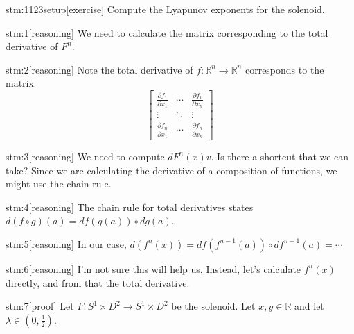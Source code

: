 
\begin{stm}{stm:1123setup}[exercise]
Compute the Lyapunov exponents for the solenoid.
\end{stm}


\begin{stm}{stm:1}[reasoning]
We need to calculate the matrix corresponding to the total derivative of $F^n$.
\end{stm}

\begin{stm}{stm:2}[reasoning]
Note the total derivative of $f \colon \mathbb{R}^n \to \mathbb{R}^n$ corresponds to the matrix
\[
\left[
\begin{array}{ccc}
\frac{\partial f_1}{\partial x_1} & \cdots & \frac{\partial f_1}{\partial x_n} \\
\vdots & \ddots & \vdots \\
\frac{\partial f_n}{\partial x_1} & \cdots & \frac{\partial f_n}{\partial x_n}
\end{array}
\right]
\]
\end{stm}

\begin{stm}{stm:3}[reasoning]
We need to compute $dF^n(x)v$. Is there a shortcut that we can take? Since we are calculating the derivative of a composition of functions, we might use the chain rule.
\end{stm}

\begin{stm}{stm:4}[reasoning]
The chain rule for total derivatives states $d(f \circ g)(a) = df(g(a)) \circ dg(a)$.
\end{stm}

\begin{stm}{stm:5}[reasoning]
In our case, $d(f^n(x)) = df(f^{n-1}(a)) \circ df^{n-1}(a) = \cdots$
\end{stm}

\begin{stm}{stm:6}[reasoning]
I'm not sure this will help us. Instead, let's calculate $f^n(x)$ directly, and from that the total derivative.
\end{stm}

\begin{stm}{stm:7}[proof]
Let $F \colon S^1 \times D^2 \to S^1 \times D^2$ be the solenoid. Let $x, y \in \mathbb{R}$ and let $\lambda \in (0, \frac{1}{2})$.
\end{stm}

